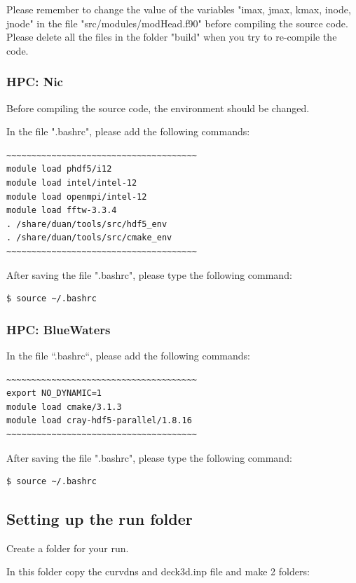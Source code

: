 \documentclass[12pt, oneside]{article}
\begin{document}
Please remember to change the value of the variables "imax, jmax, kmax, inode, jnode" in the file "src/modules/modHead.f90" before compiling the source code. Please delete all the files in the folder "build" when you try to re-compile the code.

\subsubsection{HPC: Nic}

Before compiling the source code, the environment should be changed.

In the file ".bashrc", please add the following commands:

\begin{verbatim}
~~~~~~~~~~~~~~~~~~~~~~~~~~~~~~~~~~~~~~
module load phdf5/i12
module load intel/intel-12
module load openmpi/intel-12
module load fftw-3.3.4
. /share/duan/tools/src/hdf5_env
. /share/duan/tools/src/cmake_env
~~~~~~~~~~~~~~~~~~~~~~~~~~~~~~~~~~~~~~
\end{verbatim}

After saving the file ".bashrc", please type the following command:
\begin{verbatim}
$ source ~/.bashrc
\end{verbatim}




\subsubsection{HPC: BlueWaters}

In the file ``.bashrc``, please add the following commands:

\begin{verbatim}
~~~~~~~~~~~~~~~~~~~~~~~~~~~~~~~~~~~~~~
export NO_DYNAMIC=1
module load cmake/3.1.3
module load cray-hdf5-parallel/1.8.16
~~~~~~~~~~~~~~~~~~~~~~~~~~~~~~~~~~~~~~
\end{verbatim}

After saving the file ".bashrc", please type the following command:
\begin{verbatim}
$ source ~/.bashrc
\end{verbatim}
\subsection{Setting up the run folder}
Create a folder for your run.

\noindent In this folder copy the curvdns and deck3d.inp file and  make 2 folders:
\end{document}
